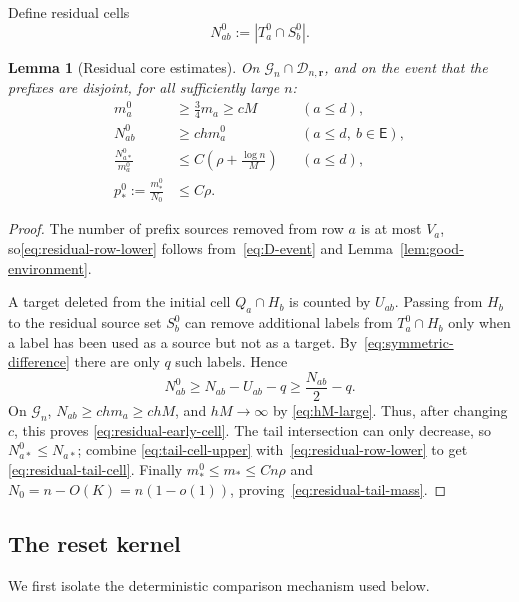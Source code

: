 \documentclass[11pt]{article}
\newcommand{\1}{\mathbf 1}
\newcommand{\cG}{\mathcal G}
\newcommand{\cD}{\mathcal D}
\newtheorem{lemma}[theorem]{Lemma}
\theoremstyle{definition}
\theoremstyle{remark}
\begin{document}
Define residual cells
\begin{equation}\label{eq:residual-cells}
  N_{ab}^0:=|T_a^0\cap S_b^0|.
\end{equation}

\begin{lemma}[Residual core estimates]
\label{lem:residual-core}
On $\cG_n\cap\cD_{n,\mathbf r}$, and on the event that the prefixes are disjoint,
for all sufficiently large $n$:
\begin{align}
 m_a^0&\geq\frac34m_a\geq cM
 &&(a\leq d),
 \label{eq:residual-row-lower}\\
 N_{ab}^0&\geq chm_a^0
 &&(a\leq d,\ b\in\mathsf E),
 \label{eq:residual-early-cell}\\
 \frac{N_{a*}^0}{m_a^0}
 &\leq C\left(\rho+\frac{\log n}{M}\right)
 &&(a\leq d),
 \label{eq:residual-tail-cell}\\
 p_*^0:=\frac{m_*^0}{N_0}&\leq C\rho.
 \label{eq:residual-tail-mass}
\end{align}
\end{lemma}

\begin{proof}
The number of prefix sources removed from row $a$ is at most $V_a$, so\eqref{eq:residual-row-lower} follows from~\eqref{eq:D-event} and
Lemma~\ref{lem:good-environment}.

A target deleted from the initial cell $Q_a\cap H_b$ is counted by
$U_{ab}$.  Passing from $H_b$ to the residual source set $S_b^0$ can
remove additional labels from $T_a^0\cap H_b$ only when a label has been
used as a source but not as a target.  By~\eqref{eq:symmetric-difference}
there are only $q$ such labels.  Hence
\[
 N_{ab}^0\geq N_{ab}-U_{ab}-q\geq \frac{N_{ab}}2-q.
\]
On $\cG_n$, $N_{ab}\geq chm_a\geq chM$, and $hM\to\infty$ by
\eqref{eq:hM-large}.  Thus, after changing $c$, this proves
\eqref{eq:residual-early-cell}.  The tail intersection can only decrease,
so $N_{a*}^0\leq N_{a*}$; combine
\eqref{eq:tail-cell-upper} with~\eqref{eq:residual-row-lower} to get
\eqref{eq:residual-tail-cell}.  Finally $m_*^0\leq m_*\leq Cn\rho$ and
$N_0=n-O(K)=n(1-o(1))$, proving~\eqref{eq:residual-tail-mass}.
\end{proof}

\subsection{The reset kernel}

We first isolate the deterministic comparison mechanism used below.
\end{document}
